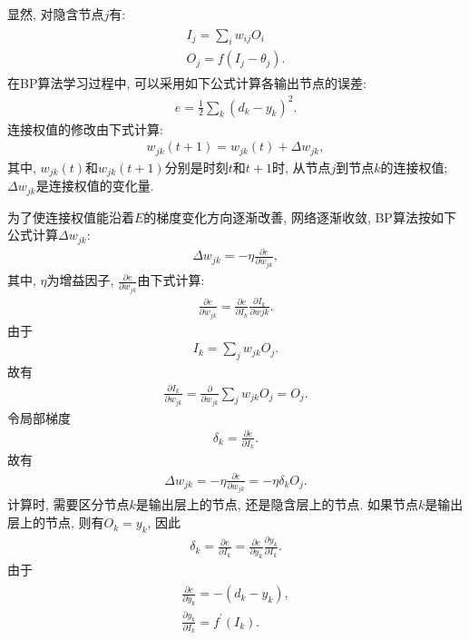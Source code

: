 显然, 对隐含节点$j$有:
\begin{align*}
  \begin{array}{l}
        I_{j}=\sum_{i} w_{i j} O_{i} \\
        O_{j}=f\left(I_{j}-\theta_{j}\right).
  \end{array}
\end{align*}
在BP算法学习过程中, 可以采用如下公式计算各输出节点的误差:
\begin{align*}
    e=\frac{1}{2} \sum_{k}\left(d_{k}-y_{k}\right)^{2}.
\end{align*}
连接权值的修改由下式计算:
\begin{align*}
    w_{j k}(t+1)=w_{j k}(t)+\Delta w_{j k},
\end{align*}
其中, $w_{jk}(t)$和$w_{jk}(t+1)$分别是时刻$t$和$t+1$时, 从节点$j$到节点$k$的连接权值; $\Delta w_{jk}$是连接权值的变化量.

为了使连接权值能沿着$E$的梯度变化方向逐渐改善, 网络逐渐收敛, BP算法按如下公式计算$\Delta w_{jk}$:
\begin{align*}
    \Delta w_{j k}=-\eta \frac{\partial e}{\partial w_{j k}},
\end{align*}
其中, $\eta$为增益因子, $\frac{\partial e}{\partial w_{j k}}$由下式计算:
\begin{align*}
    \frac{\partial e}{\partial w_{j k}}=\frac{\partial e}{\partial I_{k}} \frac{\partial I_{k}}{\partial w j k}.
\end{align*}
由于
\begin{align*}
    I_{k}=\sum_{j} w_{j k} O_{j}.
\end{align*}
故有
\begin{align*}
    \frac{\partial I_{k}}{\partial w_{j k}}=\frac{\partial}{\partial w_{j k}} \sum_{j} w_{j k} O_{j}=O_{j}.
\end{align*}
令局部梯度
\begin{align*}
    \delta_{k}=\frac{\partial e}{\partial I_{k}}.
\end{align*}
故有
\begin{align*}
    \Delta w_{j k}=-\eta \frac{\partial e}{\partial w_{j k}}=-\eta \delta_{k} O_{j}.
\end{align*}
 计算时, 需要区分节点$k$是输出层上的节点, 还是隐含层上的节点. 如果节点$k$是输出层上的节点, 则有$O_k=y_k$, 因此
\begin{align*}
    \delta_{k}=\frac{\partial e}{\partial I_{k}}=\frac{\partial e}{\partial y_{k}} \frac{\partial y_{k}}{\partial I_{k}}.
\end{align*}
由于
\begin{align*}
\begin{array}{l}
    \frac{\partial e}{\partial y_{k}}=-\left(d_{k}-y_{k}\right),\\
    \frac{\partial y_{k}}{\partial I_{k}}=f^{\prime}\left(I_{k}\right).
\end{array}
\end{align*}

